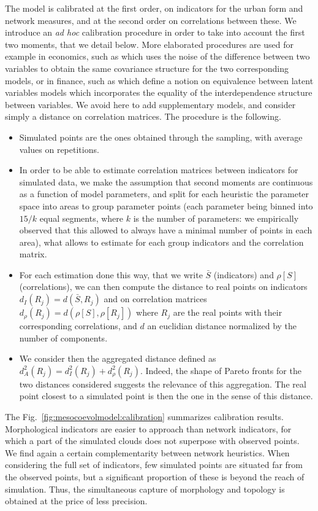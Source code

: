 \documentclass[11pt]{article}
\begin{document}
The model is calibrated at the first order, on indicators for the urban form and network measures, and at the second order on correlations between these. We introduce an \emph{ad hoc} calibration procedure in order to take into account the first two moments, that we detail below. More elaborated procedures are used for example in economics, such as \cite{watson1993measures} which uses the noise of the difference between two variables to obtain the same covariance structure for the two corresponding models, or in finance, such as \cite{frey2001copulas} which define a notion on equivalence between latent variables models which incorporates the equality of the interdependence structure between variables. We avoid here to add supplementary models, and consider simply a distance on correlation matrices. The procedure is the following.
\begin{itemize}
	\item Simulated points are the ones obtained through the sampling, with average values on repetitions.
	\item In order to be able to estimate correlation matrices between indicators for simulated data, we make the assumption that second moments are continuous as a function of model parameters, and split for each heuristic the parameter space into areas to group parameter points (each parameter being binned into $15 / k$ equal segments, where $k$ is the number of parameters: we empirically observed that this allowed to always have a minimal number of points in each area), what allows to estimate for each group indicators and the correlation matrix.
	\item For each estimation done this way, that we write $\bar{S}$ (indicators) and $\rho [S]$ (correlations), we can then compute the distance to real points on indicators $d_I (R_j) = d(\bar{S},R_j)$ and on correlation matrices $d_{\rho} (R_j) = d(\rho [S],\rho[R_j])$ where $R_j$ are the real points with their corresponding correlations, and $d$ an euclidian distance normalized by the number of components.
	\item We consider then the aggregated distance defined as $d_A^2 (R_j) = d_I^2 (R_j) + d_{\rho}^2 (R_j)$. Indeed, the shape of Pareto fronts for the two distances considered suggests the relevance of this aggregation. The real point closest to a simulated point is then the one in the sense of this distance.
\end{itemize}


The Fig.~\ref{fig:mesocoevolmodel:calibration} summarizes calibration results. Morphological indicators are easier to approach than network indicators, for which a part of the simulated clouds does not superpose with observed points. We find again a certain complementarity between network heuristics. When considering the full set of indicators, few simulated points are situated far from the observed points, but a significant proportion of these is beyond the reach of simulation. Thus, the simultaneous capture of morphology and topology is obtained at the price of less precision.
\end{document}
